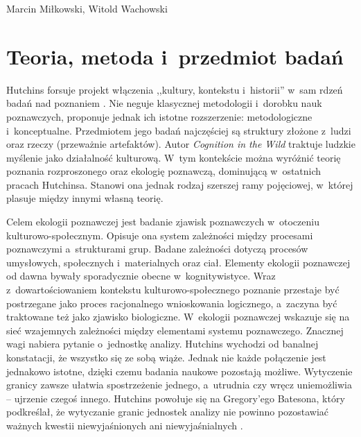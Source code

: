 \begin{artplenv2auth}{Marcin Miłkowski, Witold Wachowski}
\section{Teoria, metoda i~przedmiot badań}

Hutchins forsuje projekt włączenia ,,kultury, kontekstu i~historii'' w~sam rdzeń badań nad poznaniem
\parencite[][s.~2072]{hutchins_cognition_2001}. %
 Nie neguje klasycznej metodologii i~dorobku nauk poznawczych, proponuje jednak ich istotne rozszerzenie: metodologiczne i~konceptualne. Przedmiotem jego badań najczęściej są struktury złożone z~ludzi oraz rzeczy (przeważnie artefaktów). Autor \textit{Cognition in the Wild} traktuje ludzkie myślenie jako działalność kulturową. W~tym kontekście można wyróżnić teorię poznania rozproszonego oraz ekologię poznawczą, dominującą w~ostatnich pracach Hutchinsa. Stanowi ona jednak rodzaj szerszej ramy pojęciowej, w~której plasuje między innymi własną teorię.

Celem ekologii poznawczej jest badanie zjawisk poznawczych w~otoczeniu kulturowo-społecznym. Opisuje ona system zależności między procesami poznawczymi a~strukturami grup. Badane zależności dotyczą procesów umysłowych, społecznych i~materialnych oraz ciał. Elementy ekologii poznawczej od dawna bywały sporadycznie obecne w~kognitywistyce. Wraz z~dowartościowaniem kontekstu kulturowo-społecznego poznanie przestaje być postrzegane jako proces racjonalnego wnioskowania logicznego, a~zaczyna być traktowane też jako zjawisko biologiczne. W~ekologii poznawczej wskazuje się na sieć wzajemnych zależności między elementami systemu poznawczego. Znacznej wagi nabiera pytanie o~jednostkę analizy. Hutchins wychodzi od banalnej konstatacji, że wszystko się ze sobą wiąże. Jednak nie każde połączenie jest jednakowo istotne, dzięki czemu badania naukowe pozostają możliwe. Wytyczenie granicy zawsze ułatwia spostrzeżenie jednego, a~utrudnia czy wręcz uniemożliwia -- ujrzenie czegoś innego. Hutchins powołuje się na Gregory'ego Batesona, który podkreślał, że wytyczanie granic jednostek analizy nie powinno pozostawiać ważnych kwestii niewyjaśnionych ani niewyjaśnialnych
\parencites{hutchins_cognivite_2008}[][]{hutchins_cognitive_2010}.%



\end{artplenv2auth}
